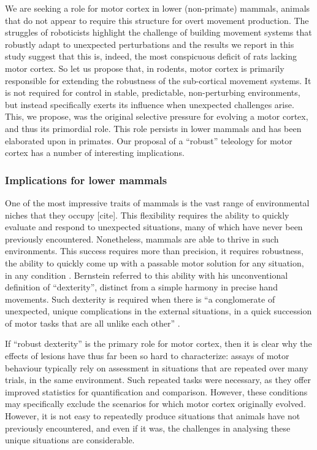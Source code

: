 We are seeking a role for motor cortex in lower (non-primate) mammals, animals that do not appear to require this structure for overt movement production. The struggles of roboticists highlight the challenge of building movement systems that robustly adapt to unexpected perturbations and the results we report in this study suggest that this is, indeed, the most conspicuous deficit of rats lacking motor cortex. So let us propose that, in rodents, motor cortex is primarily responsible for extending the robustness of the sub-cortical movement systems. It is not required for control in stable, predictable, non-perturbing environments, but instead specifically exerts its influence when unexpected challenges arise. This, we propose, was the original selective pressure for evolving a motor cortex, and thus its primordial role. This role persists in lower mammals and has been elaborated upon in primates. Our proposal of a “robust” teleology for motor cortex has a number of interesting implications.

\subsubsection*{Implications for lower mammals}

One of the most impressive traits of mammals is the vast range of environmental niches that they occupy [cite]. This flexibility requires the ability to quickly evaluate and respond to unexpected situations, many of which have never been previously encountered. Nonetheless, mammals are able to thrive in such environments. This success requires more than precision, it requires robustness, the ability to quickly come up with a passable motor solution for any situation, in any condition \cite{Bernstein1996}. Bernstein referred to this ability with his unconventional definition of “dexterity”, distinct from a simple harmony in precise hand movements. Such dexterity is required when there is \enquote{a conglomerate of unexpected, unique complications in the external situations, in a quick succession of motor tasks that are all unlike each other} \cite{Bernstein1996}.

If “robust dexterity” is the primary role for motor cortex, then it is clear why the effects of lesions have thus far been so hard to characterize: assays of motor behaviour typically rely on assessment in situations that are repeated over many trials, in the same environment. Such repeated tasks were necessary, as they offer improved statistics for quantification and comparison. However, these conditions may specifically exclude the scenarios for which motor cortex originally evolved. However, it is not easy to repeatedly produce situations that animals have not previously encountered, and even if it was, the challenges in analysing these unique situations are considerable.

